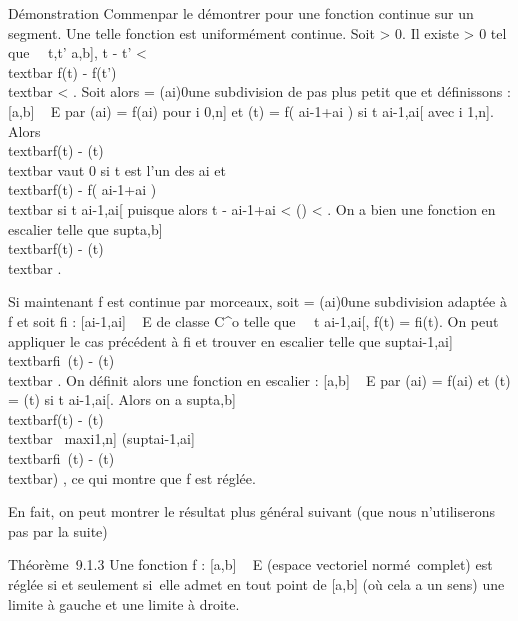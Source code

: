 Démonstration Commen\ccons par le démontrer pour une
fonction continue sur un segment. Une telle fonction est uniformément
continue. Soit \epsilon \textgreater{} 0. Il existe \eta \textgreater{} 0 tel que
\forall~~t,t' \in {[}a,b{]}, \textbar{}t - t'\textbar{}
\textless{} \eta \rigtharrow~\\textbar{} f(t) -
f(t')\\textbar{} \textless{} \epsilon. Soit alors \sigma =
(ai)0\leqi\leqn une subdivision de pas plus petit que \eta et
définissons \phi : {[}a,b{]} \rightarrow~ E par \phi(ai) = f(ai) pour
i \in {[}0,n{]} et \phi(t) = f( ai-1+ai
 ) si t \in{]}ai-1,ai{[} avec
i \in {[}1,n{]}. Alors \\textbar{}f(t) -
\phi(t)\\textbar{} vaut 0 si t est l'un des ai et
\\textbar{}f(t) - f( ai-1+ai
 )\\textbar{} \leq \epsilon si t
\in{]}ai-1,ai{[} puisque alors \textbar{}t -
ai-1+ai  \textbar{}
\textless{} \delta(\sigma) \textless{} \eta. On a bien une fonction \phi en escalier
telle que
supt\in{[}a,b{]}~\\textbar{}f(t)
- \phi(t)\\textbar{} \leq \epsilon.

Si maintenant f est continue par morceaux, soit \sigma =
(ai)0\leqi\leqn une subdivision adaptée à f et soit
fi : {[}ai-1,ai{]} \rightarrow~ E de classe
C^o telle que \forall~~t
\in{]}ai-1,ai{[}, f(t) = fi(t). On peut
appliquer le cas précédent à fi et trouver \phii en
escalier telle que
supt\in{[}ai-1,ai{]}\\textbar{}fi~(t)
- \phii(t)\\textbar{} \leq \epsilon. On définit alors une
fonction en escalier \phi : {[}a,b{]} \rightarrow~ E par \phi(ai) =
f(ai) et \phi(t) = \phii(t) si t
\in{]}ai-1,ai{[}. Alors on a
supt\in{[}a,b{]}~\\textbar{}f(t)
- \phi(t)\\textbar{} \leq\
maxi\in{[}1,n{]}\left
(supt\in{[}ai-1,ai{]}\\textbar{}fi~(t)
- \phii(t)\\textbar{}\right ) \leq \epsilon,
ce qui montre que f est réglée.

En fait, on peut montrer le résultat plus général suivant (que nous
n'utiliserons pas par la suite)

Théorème~9.1.3 Une fonction f : {[}a,b{]} \rightarrow~ E (espace vectoriel
normé~complet) est réglée si et seulement si~elle admet en tout point de
{[}a,b{]} (où cela a un sens) une limite à gauche et une limite à
droite.

